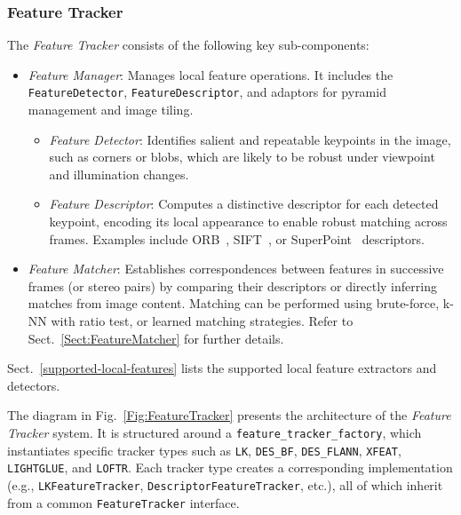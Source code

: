 \documentclass{article}
\begin{document}
\subsubsection{Feature Tracker}

The \textit{Feature Tracker} consists of the following key sub-components:

\begin{itemize} 
\item \textit{Feature Manager}: Manages local feature operations. It includes the \texttt{FeatureDetector}, \texttt{FeatureDescriptor}, and adaptors for pyramid management and image tiling. 
\begin{itemize}
\item \textit{Feature Detector}: Identifies salient and repeatable keypoints in the image, such as corners or blobs, which are likely to be robust under viewpoint and illumination changes. 

\item \textit{Feature Descriptor}: Computes a distinctive descriptor for each detected keypoint, encoding its local appearance to enable robust matching across frames. Examples include ORB~\cite{rublee2011orb}, SIFT~\cite{lowe1999object}, or SuperPoint~\cite{detone18superpoint} descriptors.

\end{itemize}

\item \textit{Feature Matcher}: Establishes correspondences between features in successive frames (or stereo pairs) by comparing their descriptors or directly inferring matches from image content. Matching can be performed using brute-force, k-NN with ratio test, or learned matching strategies. Refer to Sect.~\ref{Sect:FeatureMatcher} for further details.
\end{itemize}

Sect.~\ref{supported-local-features} lists the supported local feature extractors and detectors.

The diagram in Fig.~\ref{Fig:FeatureTracker} presents the architecture of the \textit{Feature Tracker} system. It is structured around a \texttt{feature\_tracker\_factory}, which instantiates specific tracker types such as \texttt{LK}, \texttt{DES\_BF}, \texttt{DES\_FLANN}, \texttt{XFEAT}\cite{barroso2024xfeat}, \texttt{LIGHTGLUE}\cite{lindenberger2023lightglue}, and \texttt{LOFTR}\cite{sun2021loftr}. Each tracker type creates a corresponding implementation (e.g., \texttt{LKFeatureTracker}, \texttt{DescriptorFeatureTracker}, etc.), all of which inherit from a common \texttt{FeatureTracker} interface.
\end{document}
